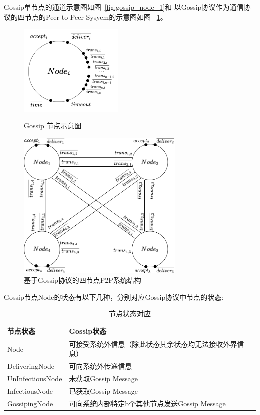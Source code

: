 Gossip单节点的通道示意图如图~\ref{fig:gossip_node_1}和
以Gossip协议作为通信协议的四节点的Peer-to-Peer Sysyem的示意图如图
~\ref{fig:p2p_system}。

\begin{figure}[!htp]
   \begin{minipage}{0.3\textwidth}
   \centering
   \includegraphics[width=5cm]{../figure/Node_gossip2.png}
   \caption{Gossip 节点示意图}
  \label{fig:gossip_node_1}
\end{minipage}\hfill
\begin{minipage}{0.6\textwidth}
   \includegraphics[width=8cm]{../figure/GossipSystem_4.png}
   \caption{基于Gossip协议的四节点P2P系统结构}
   \label{fig:p2p_system}
\end{minipage}
 \end{figure}

Gossip节点Node的状态有以下几种，分别对应Gossip协议中节点的状态:
\begin{table}[!hpt]
    \caption{节点状态对应}
    \label{tab:firstone}
    \centering
    \begin{tabular}{@{}llr@{}} \toprule
      节点状态 & Gossip状态 \\ \midrule
      Node&可接受系统外信息（除此状态其余状态均无法接收外界信息）\\
      DeliveringNode&可向系统外传递信息\\
      UnInfectiousNode&未获取Gossip Message\\
      InfectiousNode&已获取Gossip Message\\
      GossipingNode&可向系统内部特定b个其他节点发送Gossip Message\\ \bottomrule
    \end{tabular}
  \end{table}

